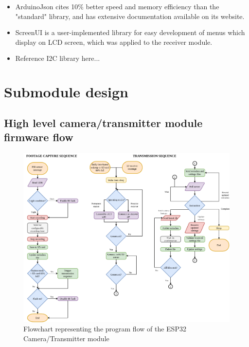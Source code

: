 \begin{itemize}
    \item ArduinoJson cites 10\% better speed and memory efficiency than the "standard" library, and has extensive documentation available on its website.
    \item ScreenUI  is a user-implemented library for easy development of menus which display on LCD screen, which was applied to the receiver module.
    \item Reference I2C library here...
\end{itemize}




\section{Submodule design} \label{s:firmware-design-process}

\subsection{High level camera/transmitter module firmware flow}

\begin{figure}[ht]
    \centering
    \includegraphics[width=\columnwidth]{"Images/ESP-flow.png"}
    \caption{Flowchart representing the program flow of the ESP32 Camera/Transmitter module}
    \label{fig:espflow}
\end{figure}

